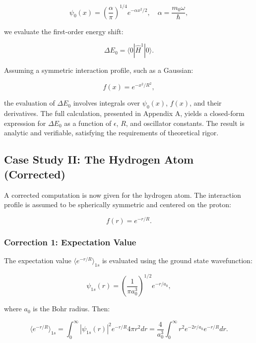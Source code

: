\documentclass[a4paper]{article}
\begin{document}
\begin{equation}
	\psi_0(x) = \left( \frac{\alpha}{\pi} \right)^{1/4} e^{-\alpha x^2 / 2}, \quad \alpha = \frac{m_0 \omega}{\hbar},
\end{equation}

we evaluate the first-order energy shift:

\begin{equation}
	\Delta E_0 = \langle 0 | \hat{H}^1 | 0 \rangle.
\end{equation}

Assuming a symmetric interaction profile, such as a Gaussian:

\begin{equation}
	f(x) = e^{-x^2 / R^2},
\end{equation}

the evaluation of \( \Delta E_0 \) involves integrals over \( \psi_0(x) \), \( f(x) \), and their derivatives. The full calculation, presented in Appendix A, yields a closed-form expression for \( \Delta E_0 \) as a function of \( \epsilon \), \( R \), and oscillator constants. The result is analytic and verifiable, satisfying the requirements of theoretical rigor.

\subsection{Case Study II: The Hydrogen Atom (Corrected)}

A corrected computation is now given for the hydrogen atom. The interaction profile is assumed to be spherically symmetric and centered on the proton:

\begin{equation}
	f(r) = e^{-r / R}.
\end{equation}

\subsubsection*{Correction 1: Expectation Value}

The expectation value \( \langle e^{-r/R} \rangle_{1s} \) is evaluated using the ground state wavefunction:

\begin{equation}
	\psi_{1s}(r) = \left( \frac{1}{\pi a_0^3} \right)^{1/2} e^{-r / a_0},
\end{equation}

where \( a_0 \) is the Bohr radius\cite{Tiesinga2021}. Then:

\begin{equation}
	\langle e^{-r/R} \rangle_{1s} = \int_0^\infty |\psi_{1s}(r)|^2 e^{-r / R} 4\pi r^2 dr = \frac{4}{a_0^3} \int_0^\infty r^2 e^{-2r / a_0} e^{-r / R} dr.
\end{equation}
\end{document}
